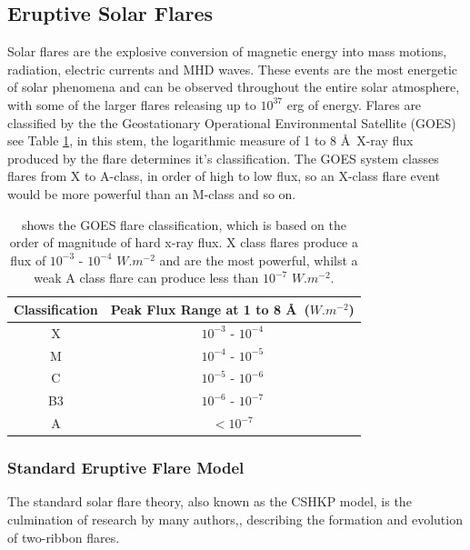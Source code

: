 \subsection{Eruptive Solar Flares}\label{flares}

Solar flares are the explosive conversion of magnetic energy into mass motions, radiation, electric currents and MHD waves. These events are the most energetic of solar phenomena and can be observed throughout the entire solar atmosphere, with some of the larger flares releasing up to $10^{37}$ erg of energy. Flares are classified by the the Geostationary Operational Environmental Satellite (GOES) see Table \ref{goes}, in this stem, the logarithmic measure of 1 to 8 \AA\ X-ray flux produced by the flare determines it's classification. The GOES system classes flares from X to A-class, in order of high to low flux, so an X-class flare event would be more powerful than an M-class and so on. \\

\begin{table}[h]
\centering
\begin{tabular}{|c|c|}\label{GOES}
Classification & Peak Flux Range at 1 to 8 \AA\ ($W.m^{-2}$) \\
\hline
X & $10^{-3}$ - $10^{-4}$\\
M & $10^{-4}$ - $10^{-5}$\\
C & $10^{-5}$ - $10^{-6}$\\
B3 & $10^{-6}$ - $10^{-7}$\\
A & $<10^{-7}$\\
\end{tabular}
\caption{shows the GOES flare classification, which is based on the order of magnitude of hard x-ray flux. X class flares produce a flux of $10^{-3}$ - $10^{-4}$ $W.m^{-2}$ and are the most powerful, whilst a weak A class flare can produce less than $10^{-7}$ $W.m^{-2}$.}\label{goes}
\end{table}

\subsubsection{Standard Eruptive Flare Model}
The standard solar flare theory, also known as the CSHKP model, is the culmination of research by many authors,\citep{1964NASSP..50..451C, 1966Natur.211..695S, 1974SoPh...34..323H, 1976SoPh...50...85K}, describing the formation and evolution of two-ribbon flares. 

